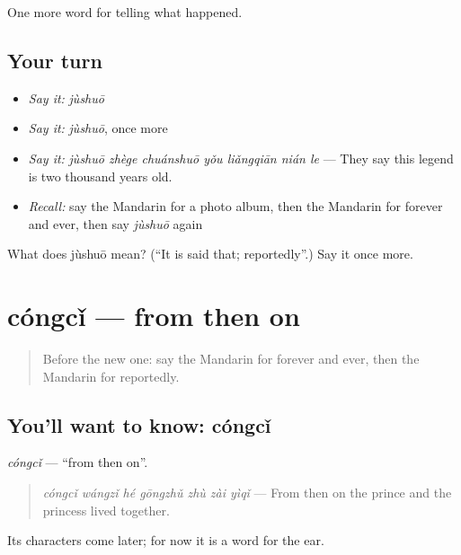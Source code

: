 \begin{grammarlens}[title={What you've built}]
One more word for telling what happened.
\end{grammarlens}

\subsection*{Your turn}
\begin{itemize}
\raggedright
  \item \emph{Say it:} \emph{jùshuō}
  \item \emph{Say it:} \emph{jùshuō}, once more
  \item \emph{Say it:} \emph{jùshuō zhège chuánshuō yǒu liǎngqiān nián le} — They say this legend is two thousand years old.
  \item \emph{Recall:} say the Mandarin for a photo album, then the Mandarin for forever and ever, then say \emph{jùshuō} again
\end{itemize}

\begin{tcolorbox}[breakable,colback=teal!4,colframe=teal!35!black,title={Before you move on}]
What does jùshuō mean? (\textquotedblleft{}It is said that; reportedly\textquotedblright{}.) Say it once more.
\end{tcolorbox}
\section[cóngcǐ]{cóngcǐ — from then on}

\label{lesson:ZH-C345-congci}



\begin{quote}
Before the new one: say the Mandarin for forever and ever, then the Mandarin for reportedly.
\end{quote}

\subsection*{You'll want to know: cóngcǐ}
\emph{cóngcǐ} — \textquotedblleft{}from then on\textquotedblright{}.

\begin{quote}
\emph{cóngcǐ wángzǐ hé gōngzhǔ zhù zài yìqǐ} — From then on the prince and the princess lived together.
\end{quote}

Its characters come later; for now it is a word for the ear.

